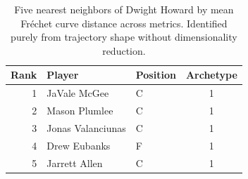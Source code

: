 \begin{table}[htbp]
  \centering\small
  \begin{tabular}{rllc}
    \toprule
    Rank & Player & Position & Archetype \\
    \midrule
    1 & JaVale McGee & C & 1 \\
    2 & Mason Plumlee & C & 1 \\
    3 & Jonas Valanciunas & C & 1 \\
    4 & Drew Eubanks & F & 1 \\
    5 & Jarrett Allen & C & 1 \\
    \bottomrule
  \end{tabular}
  \caption{Five nearest neighbors of Dwight Howard by mean Fr\'{e}chet curve distance across metrics. Identified purely from trajectory shape without dimensionality reduction.}
  \label{tab:Dwight_Howard_frechet_curve_neighbors}
\end{table}

